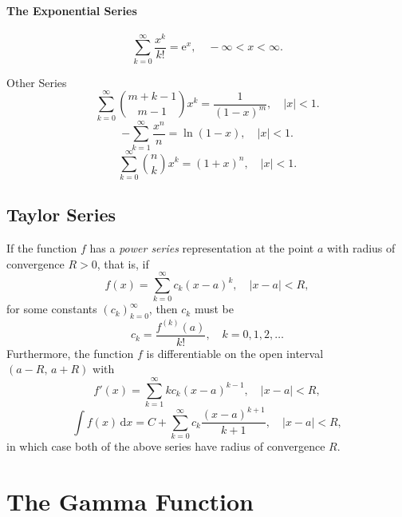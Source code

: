 \documentclass[captions=tableheading]{scrbook}
\begin{document}
\paragraph*{The Exponential Series}
\begin{equation}
\sum_{k=0}^{\infty}\frac{x^{k}}{k!} = \mathrm{e}^{x},\quad -\infty < x < \infty. \label{eq:exp-series}
\end{equation}

Other Series
\begin{equation}
\sum_{k=0}^{\infty}{m+k-1 \choose m-1}x^{k}=\frac{1}{(1-x)^{m}},\quad|x|<1.\label{eq:negbin-series}
\end{equation}
\begin{equation}
-\sum_{k=1}^{\infty}\frac{x^{n}}{n}=\ln(1-x),\quad|x|<1.\label{eq:log-series}
\end{equation}
\begin{equation}
\sum_{k=0}^{\infty}{n \choose k}x^{k}=(1+x)^{n},\quad|x|<1.\label{eq:binom-series-infinite}
\end{equation}
\subsection{Taylor Series}
\label{sec-21-3-4}


If the function \(f\) has a \emph{power series} representation at the point \(a\) with radius of convergence \(R>0\), that is, if
\begin{equation}
f(x)=\sum_{k=0}^{\infty}c_{k}(x-a)^{k},\quad|x-a|<R,
\end{equation}
for some constants \(\left(c_{k}\right)_{k=0}^{\infty}\), then \(c_{k}\) must be
\begin{equation}
c_{k}=\frac{f^{(k)}(a)}{k!},\quad k=0,1,2,\ldots
\end{equation}
Furthermore, the function \(f\) is differentiable on the open interval \((a-R,\, a+R)\) with
\begin{equation}
f'(x)=\sum_{k=1}^{\infty}kc_{k}(x-a)^{k-1},\quad|x-a|<R,
\end{equation}
\begin{equation}
\int f(x)\,\mathrm{d} x=C+\sum_{k=0}^{\infty}c_{k}\frac{(x-a)^{k+1}}{k+1},\quad|x-a|<R,
\end{equation}
in which case both of the above series have radius of convergence \(R\).
\section{The Gamma Function \label{sec:The-Gamma-Function}}
\label{sec-21-4}
\end{document}
